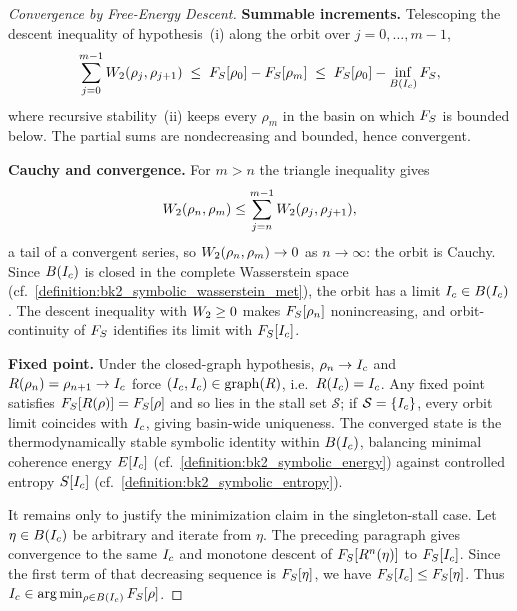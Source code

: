 \begin{proof}[Convergence by Free-Energy Descent]
\label{proof:bk7_reflective_convergence_to_stable_identity}
\textbf{Summable increments.} Telescoping the descent inequality of hypothesis~(i) along the orbit over $j = 0, \dots, m-1$,
\[
\sum_{j=0}^{m-1}W_2(\rho_j,\rho_{j+1}) \;\le\; F_S[\rho_0] - F_S[\rho_m] \;\le\; F_S[\rho_0] - \inf_{B(I_c)}F_S,
\]
where recursive stability~(ii) keeps every $\rho_m$ in the basin on which $F_S$ is bounded below. The partial sums are nondecreasing and bounded, hence convergent.

\textbf{Cauchy and convergence.} For $m > n$ the triangle inequality gives
\[W_2(\rho_n,\rho_m) \le \sum_{j=n}^{m-1}W_2(\rho_j,\rho_{j+1}),\]
a tail of a convergent series, so $W_2(\rho_n,\rho_m) \to 0$ as $n \to \infty$: the orbit is Cauchy. Since $B(I_c)$ is closed in the complete Wasserstein space (cf.~\ref{definition:bk2_symbolic_wasserstein_met}), the orbit has a limit $I_c \in B(I_c)$. The descent inequality with $W_2 \ge 0$ makes $F_S[\rho_n]$ nonincreasing, and orbit-continuity of $F_S$ identifies its limit with $F_S[I_c]$.

\textbf{Fixed point.} Under the closed-graph hypothesis, $\rho_n \to I_c$ and $R(\rho_n) = \rho_{n+1} \to I_c$ force $(I_c,I_c) \in \operatorname{graph}(R)$, i.e.\ $R(I_c) = I_c$. Any fixed point satisfies $F_S[R(\rho)] = F_S[\rho]$ and so lies in the stall set $\mathcal{S}$; if $\mathcal{S} = \{I_c\}$, every orbit limit coincides with $I_c$, giving basin-wide uniqueness. The converged state is the thermodynamically stable symbolic identity within $B(I_c)$, balancing minimal coherence energy $E[I_c]$ (cf.~\ref{definition:bk2_symbolic_energy}) against controlled entropy $S[I_c]$ (cf.~\ref{definition:bk2_symbolic_entropy}).

It remains only to justify the minimization claim in the singleton-stall case. Let $\eta \in B(I_c)$ be arbitrary and iterate from $\eta$. The preceding paragraph gives convergence to the same $I_c$ and monotone descent of $F_S[R^n(\eta)]$ to $F_S[I_c]$. Since the first term of that decreasing sequence is $F_S[\eta]$, we have $F_S[I_c] \le F_S[\eta]$. Thus $I_c \in \arg\min_{\rho \in B(I_c)}F_S[\rho]$.
\end{proof}

